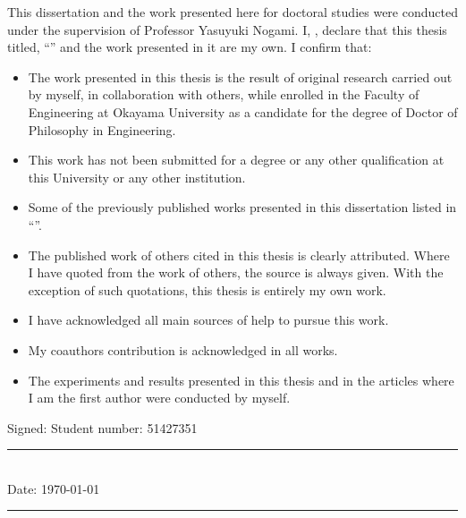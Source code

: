 \documentclass[
12pt, %
english, %
singlespacing, %
liststotoc, %
toctotoc, %
parskip, %
headsepline, %
consistentlayout, %
]{MastersDoctoralThesis} %
\begin{document}
\begin{declaration}
	
\addchaptertocentry{\authorshipname} %
\noindent This dissertation and the work presented here for doctoral studies were conducted under the supervision of Professor Yasuyuki Nogami. 
 I, \authorname, declare that this thesis titled, \enquote{\ttitle} and the work presented in it are my own. I confirm that:

\begin{itemize} 
\item 
The work presented in this thesis is the result of original research carried out by myself, in collaboration with others, while enrolled in the Faculty of Engineering at Okayama University as a candidate for the degree of Doctor of Philosophy in Engineering.

\item This work has not been submitted for a degree or any other qualification at this University or any other institution. 
 
\item  Some of the previously published works presented in this dissertation listed in ``''.

\item The published work of others cited in this thesis is clearly attributed.  Where I have quoted from the work of others, the source is always given. With the exception of such quotations, this thesis is entirely my own work.
\item I have acknowledged all main sources of help to pursue this work.
 \item My coauthors contribution is acknowledged  in all works. 
 \item The experiments and results presented in this thesis and in the articles where I am the first author were conducted by myself.\\
\end{itemize}
 \vspace{8mm}
\noindent Signed: \quad \quad \quad \quad \authorname \quad \quad \quad \quad Student number: 51427351\\ 
\rule[0.5em]{36em}{0.5pt} \\
\noindent Date: \today \\
\rule[0.5em]{36em}{0.5pt} %
\end{declaration}
\end{document}
